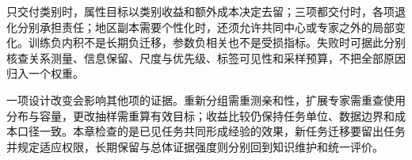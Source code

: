 只交付类别时，属性目标以类别收益和额外成本决定去留；三项都交付时，各项退化分别承担责任；地区副本需要个性化时，还须允许共同中心或专家之外的局部变化。训练负内积不是长期负迁移，参数负相关也不是受损指标。失败时可据此分别核查关系测量、信息保留、尺度与优先级、标签可见性和采样预算，不把全部原因归入一个权重。

一项设计改变会影响其他项的证据。重新分组需重测亲和性，扩展专家需重查使用分布与容量，更改抽样需重算有效目标；收益比较仍保持任务单位、数据边界和成本口径一致。本章检查的是已见任务共同形成经验的效果，新任务迁移要留出任务并规定适应权限，长期保留与总体证据强度则分别回到知识维护和统一评价。
